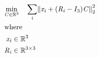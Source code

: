 \documentclass[12pt]{article}
\let\originalleft\left
\let\originalright\right
\renewcommand{\left}{\mathopen{}\mathclose\bgroup\originalleft}
\renewcommand{\right}{\aftergroup\egroup\originalright}
\begin{document}
\begin{center}
\resizebox{\textwidth}{!} 
{
\begin{minipage}[c]{\textwidth}
\begin{align*}
 \omit \span \begin{aligned} \min_{\mathit{C} \in \mathbb{R}^{ 3}} \quad & \sum_\mathit{i} \left\|\mathit{x}_{ \mathit{i} } + \left( \mathit{R}_{ \mathit{i} } - I_{ 3 } \right)\mathit{C}\right\|_2^{2} \\
\end{aligned} \\
\intertext{where} 
\mathit{x}_{\mathit{i}} & \in \mathbb{R}^{ 3} \\
\mathit{R}_{\mathit{i}} & \in \mathbb{R}^{ 3 \times 3 } \\
\\
\end{align*}
\end{minipage}
}
\end{center}
\end{document}
